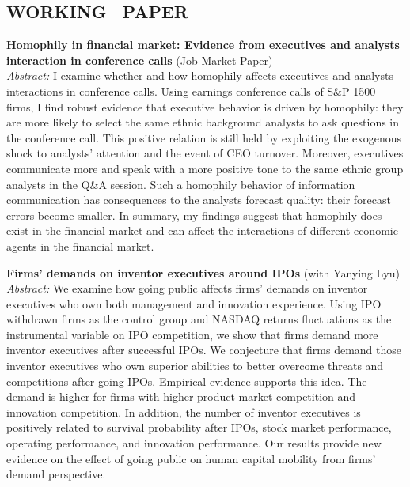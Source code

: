 \documentclass[margin]{res}
\begin{document}
\begin{resume}
\vspace{0.9em}


\section{\textbf{WORKING \ PAPER}} 
\textbf{Homophily in financial market: Evidence from executives and analysts interaction in conference calls} (Job Market Paper)\\  
\textit{Abstract:} I examine whether and how homophily affects executives and analysts interactions in conference calls. Using earnings conference calls of S\&P 1500 firms, I find robust evidence that executive behavior is driven by homophily: they are more likely to select the same ethnic background analysts to ask questions in the conference call. This positive relation is still held by exploiting the exogenous shock to analysts' attention and the event of CEO turnover. Moreover, executives communicate more and speak with a more positive tone to the same ethnic group analysts in the Q\&A session. Such a homophily behavior of information communication has consequences to the analysts forecast quality: their forecast errors become smaller. In summary, my findings suggest that homophily does exist in the financial market and can affect the interactions of different economic agents in the financial market.

\vspace{0.9em}

\textbf{Firms' demands on inventor executives around IPOs} (with Yanying Lyu)\\  
\textit{Abstract:} We examine how going public affects firms' demands on inventor executives who own both  management and innovation experience. Using IPO withdrawn firms as the control group and NASDAQ returns fluctuations as the instrumental variable on IPO competition, we show that firms demand more inventor executives after successful IPOs. We conjecture that firms demand those  inventor executives who own superior abilities to better overcome threats and competitions after going IPOs. Empirical evidence supports this idea. The demand is higher for firms with higher product market competition and innovation competition. In addition, the number of inventor executives is positively related to survival probability after IPOs, stock market performance, operating performance, and innovation performance. Our results provide new evidence on the effect of going public on human capital mobility from firms' demand perspective.


\end{resume}
\end{document}

